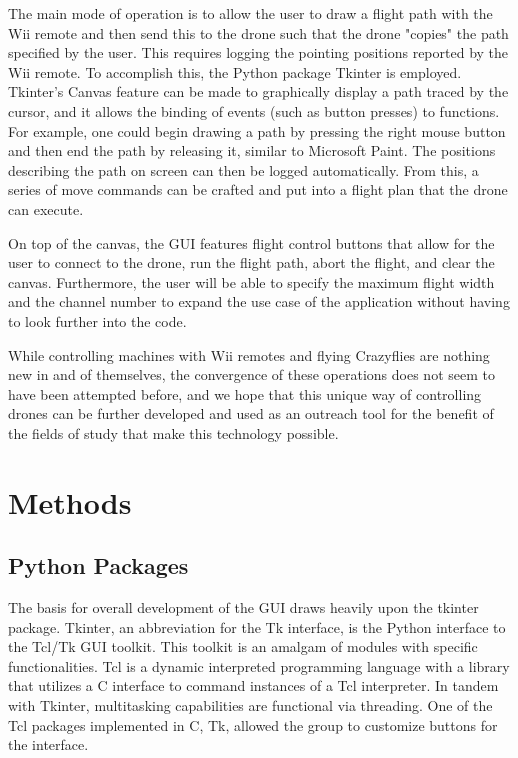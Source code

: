 \documentclass[conf]{new-aiaa}
\begin{document}
    The main mode of operation is to allow the user to draw a flight path with the Wii remote and then send this to the drone such that the drone "copies" the path specified by the user. This requires logging the pointing positions reported by the Wii remote. To accomplish this, the Python package Tkinter is employed. \cite{tkinter} Tkinter's Canvas feature can be made to graphically display a path traced by the cursor, and it allows the binding of events (such as button presses) to functions. For example, one could begin drawing a path by pressing the right mouse button and then end the path by releasing it, similar to Microsoft Paint. The positions describing the path on screen can then be logged automatically. From this, a series of move commands can be crafted and put into a flight plan that the drone can execute.

    On top of the canvas, the GUI features flight control buttons that allow for the user to connect to the drone, run the flight path, abort the flight, and clear the canvas. Furthermore, the user will be able to specify the maximum flight width and the channel number to expand the use case of the application without having to look further into the code. 
    
    While controlling machines with Wii remotes and flying Crazyflies are nothing new in and of themselves, the convergence of these operations does not seem to have been attempted before, and we hope that this unique way of controlling drones can be further developed and used as an outreach tool for the benefit of the fields of study that make this technology possible.

\section{Methods}

    \subsection{Python Packages}
        
        The basis for overall development of the GUI draws heavily upon the tkinter package. Tkinter, an abbreviation for the Tk interface, is the Python interface to the Tcl/Tk GUI toolkit. This toolkit is an amalgam of modules with specific functionalities. Tcl is a dynamic interpreted programming language with a library that utilizes a C interface to command instances of a Tcl interpreter. In tandem with Tkinter, multitasking capabilities are functional via threading. One of the Tcl packages implemented in C, Tk, allowed the group to customize buttons for the interface.
        
\end{document}
